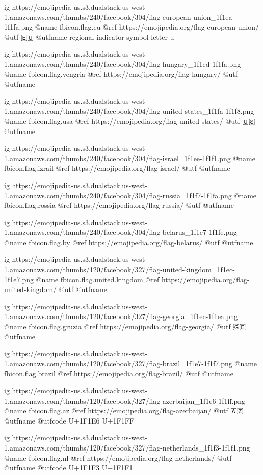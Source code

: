  
 
 
 
 

\ifcmt

  ig https://emojipedia-us.s3.dualstack.us-west-1.amazonaws.com/thumbs/240/facebook/304/flag-european-union_1f1ea-1f1fa.png
  @name fbicon.flag.eu
  @ref https://emojipedia.org/flag-european-union/
  @utf 🇪🇺
  @utfname regional indicator symbol letter u

  ig https://emojipedia-us.s3.dualstack.us-west-1.amazonaws.com/thumbs/240/facebook/304/flag-hungary_1f1ed-1f1fa.png
  @name fbicon.flag.vengria
  @ref https://emojipedia.org/flag-hungary/
  @utf
  @utfname

  ig https://emojipedia-us.s3.dualstack.us-west-1.amazonaws.com/thumbs/240/facebook/304/flag-united-states_1f1fa-1f1f8.png
  @name fbicon.flag.usa
  @ref https://emojipedia.org/flag-united-states/
  @utf 🇺🇸
  @utfname

  ig https://emojipedia-us.s3.dualstack.us-west-1.amazonaws.com/thumbs/240/facebook/304/flag-israel_1f1ee-1f1f1.png
  @name fbicon.flag.izrail
  @ref https://emojipedia.org/flag-israel/
  @utf
  @utfname

  ig https://emojipedia-us.s3.dualstack.us-west-1.amazonaws.com/thumbs/240/facebook/304/flag-russia_1f1f7-1f1fa.png
  @name fbicon.flag.rossia
  @ref https://emojipedia.org/flag-russia/
  @utf 
  @utfname

  ig https://emojipedia-us.s3.dualstack.us-west-1.amazonaws.com/thumbs/240/facebook/304/flag-belarus_1f1e7-1f1fe.png
  @name fbicon.flag.by
  @ref https://emojipedia.org/flag-belarus/
  @utf
  @utfname

	ig https://emojipedia-us.s3.dualstack.us-west-1.amazonaws.com/thumbs/120/facebook/327/flag-united-kingdom_1f1ec-1f1e7.png
	@name fbicon.flag.united.kingdom
	@ref https://emojipedia.org/flag-united-kingdom/
	@utf
	@utfname

	ig https://emojipedia-us.s3.dualstack.us-west-1.amazonaws.com/thumbs/120/facebook/327/flag-georgia_1f1ec-1f1ea.png
	@name fbicon.flag.gruzia
	@ref https://emojipedia.org/flag-georgia/
	@utf 🇬🇪
	@utfname

	ig https://emojipedia-us.s3.dualstack.us-west-1.amazonaws.com/thumbs/120/facebook/327/flag-brazil_1f1e7-1f1f7.png
	@name fbicon.flag.brazil
	@ref https://emojipedia.org/flag-brazil/
	@utf
	@utfname

	ig https://emojipedia-us.s3.dualstack.us-west-1.amazonaws.com/thumbs/120/facebook/327/flag-azerbaijan_1f1e6-1f1ff.png
	@name fbicon.flag.az
	@ref https://emojipedia.org/flag-azerbaijan/
	@utf 🇦🇿
	@utfname
	@utfcode U+1F1E6 U+1F1FF

	ig https://emojipedia-us.s3.dualstack.us-west-1.amazonaws.com/thumbs/120/facebook/327/flag-netherlands_1f1f3-1f1f1.png
	@name fbicon.flag.nl
	@ref https://emojipedia.org/flag-netherlands/
	@utf
	@utfname
	@utfcode  U+1F1F3 U+1F1F1
	
\fi
